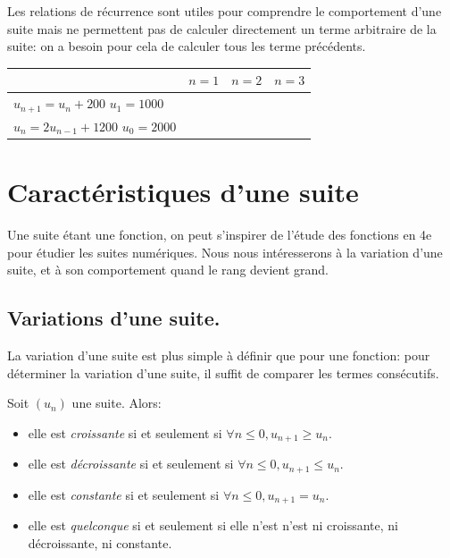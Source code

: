 \documentclass[a4paper,12pt]{report}
\begin{document}
Les relations de récurrence sont utiles pour comprendre le comportement d'une
suite mais ne permettent pas de calculer directement un terme arbitraire de la
suite: on a besoin pour cela de calculer tous les terme précédents.

\begin{center}
\begin{tabular}{|p{3.2cm}|p{3cm}|p{3cm}|p{3cm}|}
\hline
 & \(n=1\) & \(n=2\) & \(n=3\)\\[0pt]
\hline
\(u_{n+1}=u_n+200\) \(u_1=1000\) &  &  & \\[0pt]
\hline
\(u_{n}=2u_{n-1}+1200\) \(u_0=2000\) &  &  & \\[0pt]
\hline
\end{tabular}
\end{center}


\section{Caractéristiques d'une suite}
\label{sec:org53a5220}

Une suite étant une fonction, on peut s'inspirer de l'étude des fonctions en 4e
pour étudier les suites numériques. Nous nous intéresserons à la variation d'une
suite, et à son comportement quand le rang devient grand.

\subsection{Variations d'une suite.}
\label{sec:org7a6c5de}

La variation d'une suite est plus simple à définir que pour une fonction: pour
déterminer la variation d'une suite, il suffit de comparer les termes
consécutifs.

\begin{definition}
Soit \((u_n)\) une suite. Alors:
\begin{itemize}
\item elle est \emph{croissante} si et seulement si \(\forall n\le 0, u_{n+1}\ge u_n\).
\item elle est \emph{décroissante} si et seulement si \(\forall n\le 0, u_{n+1}\le u_n\).
\item elle est \emph{constante} si et seulement si \(\forall n\le 0, u_{n+1}= u_n\).
\item elle est \emph{quelconque} si et seulement si elle n'est n'est ni croissante, ni
décroissante, ni constante.
\end{itemize}
\end{definition}
\end{document}
